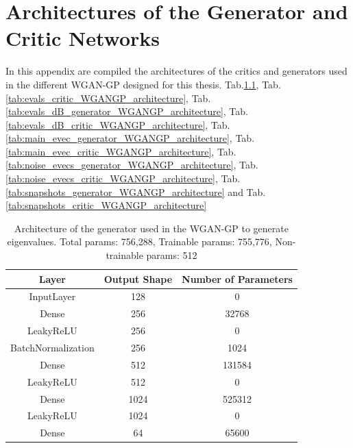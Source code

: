 \documentclass[11pt,a4paper,twoside]{report}
\begin{document}
\cleardoublepage

\appendix
\fancyhead[LO]{\rightmark}
\fancyhead[RO]{\scshape\appendixname\ \thechapter}
\fancyhead[LE]{\scshape\appendixname\ \thechapter}
\fancyhead[RE]{\textsc{\leftmark}}


\chapter[Architectures of the Different Networks]{Architectures of the Generator and Critic Networks}

In this appendix are compiled the architectures of the critics and generators used in the different WGAN-GP designed for this thesis.
Tab.\ref{tab:evals_generator_WGANGP_architecture}, Tab.\ref{tab:evals_critic_WGANGP_architecture}, Tab.\ref{tab:evals_dB_generator_WGANGP_architecture}, Tab.\ref{tab:evals_dB_critic_WGANGP_architecture}, Tab.\ref{tab:main_evec_generator_WGANGP_architecture}, Tab.\ref{tab:main_evec_critic_WGANGP_architecture}, Tab.\ref{tab:noise_evecs_generator_WGANGP_architecture}, Tab.\ref{tab:noise_evecs_critic_WGANGP_architecture}, Tab.\ref{tab:snapshots_generator_WGANGP_architecture} and Tab.\ref{tab:snapshots_critic_WGANGP_architecture}


\begin{table}[]
  \centering
  \begin{tabular}{c c c}
      \hline
      \textbf{Layer} & \textbf{Output Shape} & \textbf{Number of Parameters} \\ \hline
      InputLayer            & 128           & 0                 \\ 
      Dense                 & 256           & 32768             \\ 
      LeakyReLU             & 256           & 0                 \\ 
      BatchNormalization    & 256           & 1024              \\ 
      Dense                 & 512           & 131584            \\ 
      LeakyReLU             & 512           & 0                 \\ 
      Dense                 & 1024          & 525312            \\ 
      LeakyReLU             & 1024          & 0                 \\ 
      Dense                 & 64            & 65600             \\ 
      \end{tabular}
  \caption{Architecture of the generator used in the WGAN-GP to generate eigenvalues. Total params: 756,288, Trainable params: 755,776, Non-trainable params: 512}
  \label{tab:evals_generator_WGANGP_architecture}
\end{table}
\end{document}
